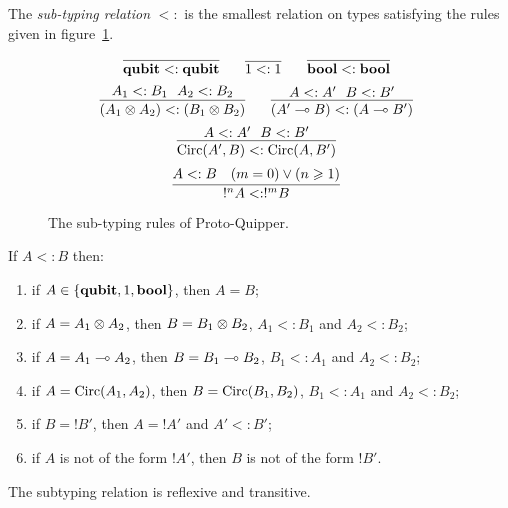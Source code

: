 \documentclass[twoside]{article}
\begin{document}
\begin{definition}
The \emph{sub-typing relation} $<:$ is the smallest relation on 
types satisfying the rules given in 
figure~\hyperref[subtyping_congruences]{\ref*{subtyping_congruences}}.
\end{definition}

\begin{figure}[!ht]
\begin{mdframed}
\[
  \infer[]{\qubit <: \qubit}{}
~~~~
  \infer[]{1 <: 1}{}
~~~~
  \infer[]{\bool <: \bool}{}
\]
\[
  \infer[]{ (A_1\x A_2) <:  (B_1 \x B_2)}{A_1<:B_1~~A_2<:B_2}
~~~~
  \infer[]{ (A'\loli B) <: (A\loli B')}{A<:A'~~B<:B'}
\]
\[
  \infer[]{ \Circ(A', B) <:  \Circ(A, B')}{A<:A'~~B<:B'}
\]
\[
  \infer[]{ !^nA <: !^mB}{
    A<:B
    &
    (m=0)\vee (n\geq 1)
  }
\]
%
\end{mdframed}
\caption{The sub-typing rules of Proto-Quipper.}
\label{subtyping_congruences}
\end{figure}

\begin{remark}
\label{subtyping_shape}
If $A<:B$ then:
\begin{enumerate}
  \item if $A\in\{\textrm{\bf qubit}, 1, \textrm{\bf bool}\}$, then $A=B$;
  \item if $A=A_1\otimes A_2$, then $B=B_1\otimes B_2$, 
  $A_1<:B_1$ and $A_2<:B_2$;
  \item if $A=A_1\multimap A_2$, then $B=B_1\multimap B_2$, 
  $B_1<:A_1$ and $A_2<:B_2$;
  \item if $A=\mathop{\textrm{Circ}}\nolimits(A_1, A_2)$, then $B=\mathop{\textrm{Circ}}\nolimits(B_1,B_2)$, 
  $B_1<:A_1$ and $A_2<:B_2$;
  \item if $B=!B'$, then $A=!A'$ and $A'<:B'$;\label{subtype_bang}
  \item if $A$ is not of the form $!A'$, then $B$ is not 
  of the form $!B'$.
\end{enumerate}
\end{remark}

\begin{proposition}
The subtyping relation is reflexive and transitive.
\end{proposition}
\end{document}
